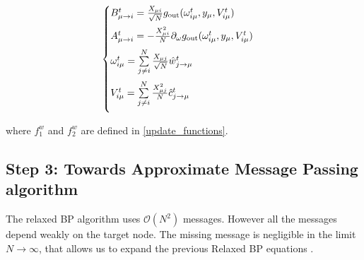 \documentclass[aip,jmp,amsmath,amssymb,reprint]{revtex4}
\begin{document}
\begin{minipage}[c]{.46\linewidth}
\begin{equation}
	\begin{cases}
			B_{\mu \to i}^t =  \frac{X_{\mu i}}{\sqrt{N}} g_{\rm out} (\omega_{i\mu}^t, y_{\mu}, V_{i\mu}^t)\vspace{0.2cm}  \\
		A_{\mu \to i}^t = - \frac{X_{\mu i}^2}{N}  \partial_\omega g_{\rm out}(\omega_{i\mu}^t, y_{\mu}, V_{i\mu}^t)\vspace{0.2cm} \\
		\omega_{i\mu}^t = \sum\limits_{j\neq i}^N \frac{X_{\mu j}}{\sqrt{N}}   \hat{w}_{j\to \mu}^t\vspace{0.2cm} \\
		V_{i\mu}^t = \sum\limits_{j\neq i}^N \frac{X_{\mu j}^2}{N} \hat{c}_{j\to \mu}^t \vspace{0.2cm}
	\end{cases}\\
\end{equation}      
\end{minipage}


where $f_1^w$ and $f_2^w$ are defined in \ref{update_functions}.


\subsection{Step 3: Towards Approximate Message Passing algorithm}
The relaxed BP algorithm uses $\mathcal{O}(N^2)$ messages. However all the messages depend weakly on the target node. The missing message is negligible in the limit $N \to \infty$, that allows us to expand the previous Relaxed BP equations \Eq{\ref{supp:relaxed_BP}}.\\
\end{document}
